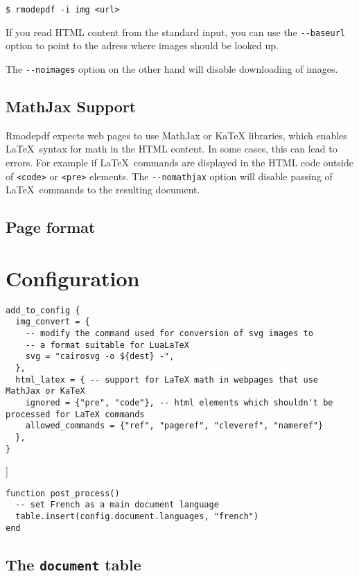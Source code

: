 \documentclass{article}
\begin{document}
\begin{verbatim}
$ rmodepdf -i img <url>
\end{verbatim}

If you read HTML content from the standard input, you can use the \verb|--baseurl| option to  
point to the adress where images should be looked up.

The \verb|--noimages| option on the other hand will disable downloading of images.

\subsection{MathJax Support}

Rmodepdf expects web pages to use MathJax or KaTeX libraries, which enables \LaTeX\ syntax for math 
in the HTML content. In some cases, this can lead to errors. For example if  \LaTeX\ commands are 
displayed in the HTML code outside of \verb|<code>| or \verb|<pre>| elements. The \verb|--nomathjax| option
will disable passing of \LaTeX\ commands to the resulting document.


\subsection{Page format}




\section{Configuration}


\begin{verbatim}
add_to_config {
  img_convert = { 
    -- modify the command used for conversion of svg images to 
    -- a format suitable for LuaLaTeX
    svg = "cairosvg -o ${dest} -", 
  },
  html_latex = { -- support for LaTeX math in webpages that use MathJax or KaTeX
    ignored = {"pre", "code"}, -- html elements which shouldn't be processed for LaTeX commands
    allowed_commands = {"ref", "pageref", "cleveref", "nameref"}
  },
}
\end{verbatim}]


\begin{verbatim}
function post_process()
  -- set French as a main document language
  table.insert(config.document.languages, "french")
end
\end{verbatim}


\subsection{The \texttt{document} table}
\end{document}
